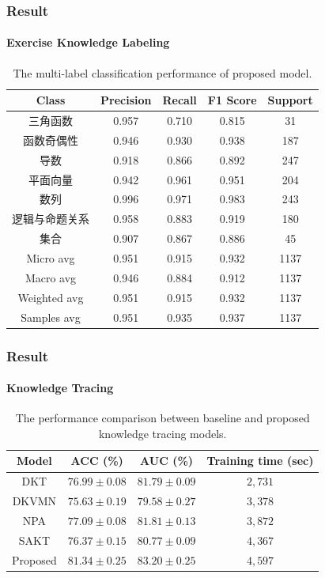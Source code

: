 \documentclass{beamer}
\begin{document}
\begin{frame}
	\frametitle{Result}
	\framesubtitle{Exercise Knowledge Labeling}
	\begin{table}[htbp!]
		\caption{The multi-label classification performance of proposed model.}\label{tbl:ch2-result-detail}
		\centering
		\begin{tabular}{ccccc}
			\toprule
			Class          & Precision & Recall & F1 Score & Support \\
			\midrule
			三角函数       & 0.957     & 0.710  & 0.815    & 31      \\
			函数奇偶性     & 0.946     & 0.930  & 0.938    & 187     \\
			导数           & 0.918     & 0.866  & 0.892    & 247     \\
			平面向量       & 0.942     & 0.961  & 0.951    & 204     \\
			数列           & 0.996     & 0.971  & 0.983    & 243     \\
			逻辑与命题关系 & 0.958     & 0.883  & 0.919    & 180     \\
			集合           & 0.907     & 0.867  & 0.886    & 45      \\
			\midrule
			Micro avg      & 0.951     & 0.915  & 0.932    & 1137    \\
			Macro avg      & 0.946     & 0.884  & 0.912    & 1137    \\
			Weighted avg   & 0.951     & 0.915  & 0.932    & 1137    \\
			Samples avg    & 0.951     & 0.935  & 0.937    & 1137    \\
			\bottomrule
		\end{tabular}
	\end{table}
\end{frame}


\begin{frame}
	\frametitle{Result}
	\framesubtitle{Knowledge Tracing}
	\begin{table}[htb]
		\centering
		\caption{The performance comparison between baseline and proposed knowledge tracing models.}\label{tbl:ch3-performance}
		\begin{tabular}{cccc}
			\toprule
			Model    & ACC (\%)                    & AUC (\%)                   & Training time (sec) \\
			\midrule
			DKT      & \(76.99\pm 0.08 \)          & \(81.79\pm 0.09\)          & \(2,731\)           \\
			DKVMN    & \(75.63\pm 0.19 \)          & \(79.58\pm 0.27\)          & \(3,378\)           \\
			NPA      & \(77.09\pm 0.08\)           & \(81.81\pm 0.13\)          & \(3,872\)           \\
			SAKT     & \(76.37\pm 0.15\)           & \(80.77\pm 0.09\)          & \(4,367\)           \\
			\midrule
			Proposed & \(\mathbf{81.34\pm 0.25} \) & \(\mathbf{83.20\pm 0.25}\) & \(4,597\)           \\
			\bottomrule
		\end{tabular}
	\end{table}
\end{frame}
\end{document}
